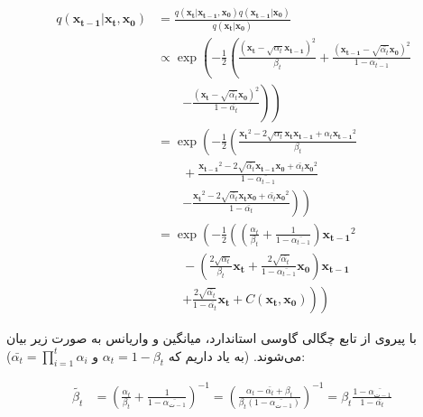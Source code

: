 \begin{equation}
	\begin{aligned}
		q(\mathbf{x_{t-1}}|\mathbf{x_t}, \mathbf{x_0}) &= \frac{q(\mathbf{x_t}|\mathbf{x_{t-1}}, \mathbf{x_0}) q(\mathbf{x_{t-1}}|\mathbf{x_0})}{q(\mathbf{x_t}|\mathbf{x_0})} \\
		&\propto \exp \left( -\frac{1}{2} \left( \frac{(\mathbf{x_t} - \sqrt{\alpha_t}\mathbf{x_{t-1}})^2}{\beta_t} + \frac{(\mathbf{x_{t-1}} - \sqrt{\bar{\alpha_t}}\mathbf{x_0})^2}{1 - \bar{\alpha_{t-1}}} \right. \right. \\
		&\qquad \left. \left. - \frac{(\mathbf{x_t} - \sqrt{\bar{\alpha_t}}\mathbf{x_0})^2}{1 - \bar{\alpha_t}} \right) \right) \\
		&= \exp \left( -\frac{1}{2} \left( \frac{\mathbf{x_t}^2 - 2\sqrt{\alpha_t}\mathbf{x_t}\mathbf{x_{t-1}} + \alpha_t\mathbf{x_{t-1}}^2}{\beta_t} \right. \right. \\
		&\qquad + \frac{\mathbf{x_{t-1}}^2 - 2\sqrt{\bar{\alpha_t}}\mathbf{x_{t-1}}\mathbf{x_0} + \bar{\alpha_t}\mathbf{x_0}^2}{1 - \bar{\alpha_{t-1}}} \\
		&\qquad \left. \left. - \frac{\mathbf{x_t}^2 - 2\sqrt{\bar{\alpha_t}}\mathbf{x_t}\mathbf{x_0} + \bar{\alpha_t}\mathbf{x_0}^2}{1 - \bar{\alpha_t}} \right) \right) \\
		&= \exp \left( -\frac{1}{2} \left( \left( \frac{\alpha_t}{\beta_t} + \frac{1}{1 - \bar{\alpha_{t-1}}} \right)\mathbf{x_{t-1}}^2 \right. \right. \\
		&\qquad - \left( \frac{2\sqrt{\alpha_t}}{\beta_t}\mathbf{x_t} + \frac{2\sqrt{\bar{\alpha_t}}}{1 - \bar{\alpha_{t-1}}}\mathbf{x_0} \right)\mathbf{x_{t-1}} \\
		&\qquad \left. \left. + \frac{2\sqrt{\bar{\alpha_t}}}{1 - \bar{\alpha_t}}\mathbf{x_t} + C(\mathbf{x_t}, \mathbf{x_0}) \right) \right)
	\end{aligned}
\end{equation}





با پیروی از تابع چگالی گاوسی استاندارد، میانگین و واریانس به صورت زیر بیان می‌شوند. (به یاد داریم که $\alpha_t = 1 - \beta_t$ و $\bar{\alpha_t} = \prod_{i=1}^{t} \alpha_i$):



\begin{equation}
	\begin{aligned}
		\tilde{\beta_t} &= \left( \frac{\alpha_t}{\beta_t} + \frac{1}{1 - \bar{\alpha_{ت-1}}} \right)^{-1} = \left( \frac{\alpha_t - \bar{\alpha_t} + \beta_t}{\beta_t (1 - \bar{\alpha_{ت-1}})} \right)^{-1} = \beta_t \frac{1 - \bar{\alpha_{ت-1}}}{1 - \bar{\alpha_t}} \
	\end{aligned}
\end{equation}





